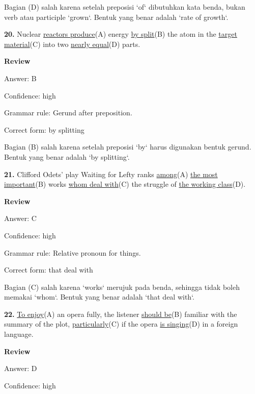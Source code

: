 \documentclass[12pt]{article}
\begin{document}
Bagian (D) salah karena setelah preposisi `of` dibutuhkan kata benda, bukan verb atau participle `grown`. Bentuk yang benar adalah `rate of growth`.\par
\endgroup
\par
\vspace{\questionblockgap}
\noindent\textbf{20.} Nuclear \uline{reactors produce}(A) energy \uline{by split}(B) the atom in the \uline{target material}(C) into two \uline{nearly equal}(D) parts.
\par
\begingroup
\setlength{\parskip}{0pt}
\setlength{\parindent}{0pt}
\textbf{Review}\par
Answer: B\par
Confidence: high\par
Grammar rule: Gerund after preposition.\par
Correct form: by splitting\par
Bagian (B) salah karena setelah preposisi `by` harus digunakan bentuk gerund. Bentuk yang benar adalah `by splitting`.\par
\endgroup
\par
\vspace{\questionblockgap}
\noindent\textbf{21.} Clifford Odets' play Waiting for Lefty ranks \uline{among}(A) \uline{the most important}(B) works \uline{whom deal with}(C) the struggle of \uline{the working class}(D).
\par
\begingroup
\setlength{\parskip}{0pt}
\setlength{\parindent}{0pt}
\textbf{Review}\par
Answer: C\par
Confidence: high\par
Grammar rule: Relative pronoun for things.\par
Correct form: that deal with\par
Bagian (C) salah karena `works` merujuk pada benda, sehingga tidak boleh memakai `whom`. Bentuk yang benar adalah `that deal with`.\par
\endgroup
\par
\vspace{\questionblockgap}
\noindent\textbf{22.} \uline{To enjoy}(A) an opera fully, the listener \uline{should be}(B) familiar with the summary of the plot, \uline{particularly}(C) if the opera \uline{is singing}(D) in a foreign language.
\par
\begingroup
\setlength{\parskip}{0pt}
\setlength{\parindent}{0pt}
\textbf{Review}\par
Answer: D\par
Confidence: high\par
\end{document}
